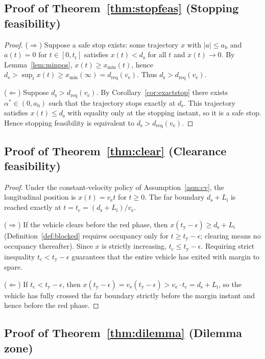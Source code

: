\documentclass[conference, a4paper]{IEEEtran}
\theoremstyle{plain}
\newcommand{\dreq}{d_{\mathrm{req}}}
\newcommand{\ds}{d_{\mathrm{s}}}
\newcommand{\tclear}{t_{\mathrm{c}}}
\newcommand{\tred}{t_{\mathrm{y}}}
\newcommand{\ab}{a_{\mathrm{b}}}
\newcommand{\tr}{t_{\mathrm{r}}}
\newcommand{\Li}{L_{\mathrm{i}}}
\newcommand{\ve}{v_{\mathrm{e}}}
\begin{document}
\subsection{Proof of Theorem~\ref{thm:stopfeas} (Stopping feasibility)}

\begin{proof}
($\Rightarrow$) Suppose a safe stop exists: some trajectory $x$ with
$|a| \leq \ab$ and $a(t) = 0$ for $t \in [0,\tr]$ satisfies
$x(t) < \ds$ for all $t$ and $\dot{x}(t) \to 0$. By
Lemma~\ref{lem:minpos}, $x(t) \geq x_{\min}(t)$, hence
$\ds > \sup_t x(t) \geq x_{\min}(\infty) = \dreq(\ve)$. Thus
$\ds > \dreq(\ve)$.

($\Leftarrow$) Suppose $\ds > \dreq(\ve)$. By
Corollary~\ref{cor:exactstop} there exists $\alpha^* \in (0,\ab)$ such that
the trajectory stops exactly at $\ds$. This trajectory satisfies
$x(t) \leq \ds$ with equality only at the stopping instant, so it is a safe
stop. Hence stopping feasibility is equivalent to $\ds > \dreq(\ve)$.
\end{proof}

\subsection{Proof of Theorem~\ref{thm:clear} (Clearance feasibility)}

\begin{proof}
Under the constant-velocity policy of Assumption~\ref{asm:cv}, the
longitudinal position is $x(t) = \ve t$ for $t \geq 0$. The far boundary
$\ds + \Li$ is reached exactly at $t = \tclear = (\ds + \Li)/\ve$.

($\Rightarrow$) If the vehicle clears before the red phase, then
$x(\tred - \epsilon) \geq \ds + \Li$ (Definition~\ref{def:blocked} requires
occupancy only for $t \geq \tred - \epsilon$; clearing means no occupancy
thereafter). Since $x$ is strictly increasing, $\tclear \leq \tred -
\epsilon$. Requiring strict inequality $\tclear < \tred - \epsilon$
guarantees that the entire vehicle has exited with margin to spare.

($\Leftarrow$) If $\tclear < \tred - \epsilon$, then
$x(\tred-\epsilon) = \ve(\tred-\epsilon) > \ve \cdot \tclear = \ds + \Li$,
so the vehicle has fully crossed the far boundary strictly before the margin
instant and hence before the red phase.
\end{proof}

\subsection{Proof of Theorem~\ref{thm:dilemma} (Dilemma zone)}
\end{document}
